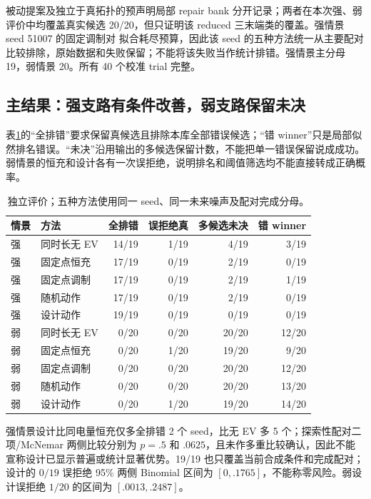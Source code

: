 \documentclass[UTF8,fontset=fandol,11pt,a4paper]{ctexart}
\begin{document}
被动提案及独立于真拓扑的预声明局部 repair bank 分开记录；两者在本次强、弱评价中均覆盖真实候选 20/20，但只证明该 reduced 三末端类的覆盖。强情景 seed 51007 的固定调制对  拟合耗尽预算，因此该 seed 的五种方法统一从主要配对比较排除，原始数据和失败保留；不能将该失败当作统计排错。强情景主分母 19，弱情景 20。所有 40 个校准 trial 完整。

\subsection{主结果：强支路有条件改善，弱支路保留未决}
表\ref{tab:main}的“全排错”要求保留真候选且排除本库全部错误候选；“错 winner”只是局部似然排名错误。“未决”沿用输出的多候选保留计数，不能把单一错误保留说成成功。弱情景的恒充和设计各有一次误拒绝，说明排名和阈值筛选均不能直接转成正确概率。
\begin{table}[htbp]\centering\small
\caption{独立评价；五种方法使用同一 seed、同一未来噪声及配对完成分母。}\label{tab:main}
\begin{tabular}{llrrrr}\toprule
情景 & 方法 & 全排错 & 误拒绝真 & 多候选未决 & 错 winner\\\midrule
强 & 同时长无 EV & 14/19 & 1/19 & 4/19 & 3/19\\
强 & 固定点恒充 & 17/19 & 0/19 & 2/19 & 0/19\\
强 & 固定点调制 & 17/19 & 0/19 & 2/19 & 1/19\\
强 & 随机动作 & 17/19 & 0/19 & 2/19 & 0/19\\
强 & 设计动作 & 19/19 & 0/19 & 0/19 & 0/19\\\midrule
弱 & 同时长无 EV & 0/20 & 0/20 & 20/20 & 12/20\\
弱 & 固定点恒充 & 0/20 & 1/20 & 19/20 & 9/20\\
弱 & 固定点调制 & 0/20 & 0/20 & 20/20 & 12/20\\
弱 & 随机动作 & 0/20 & 0/20 & 20/20 & 13/20\\
弱 & 设计动作 & 0/20 & 1/20 & 19/20 & 14/20\\\bottomrule
\end{tabular}
\end{table}

\begin{samepage}
强情景设计比同电量恒充仅多全排错 2 个 seed，比无 EV 多 5 个；探索性配对二项/McNemar 两侧比较分别为 $p=.5$ 和 $.0625$，且未作多重比较确认，因此不能宣称设计已显示普遍或统计显著优势。19/19 也只覆盖当前合成条件和完成配对；设计的 $0/19$ 误拒绝 95\% 两侧 Binomial 区间为 $[0,.1765]$，不能称零风险。弱设计误拒绝 $1/20$ 的区间为 $[.0013,.2487]$。

\end{samepage}
\end{document}
